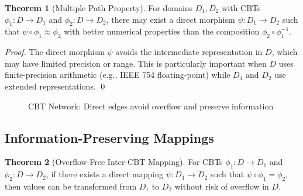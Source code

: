 \documentclass[12pt,a4paper]{article}
\theoremstyle{definition}
\newtheorem{theorem}{Theorem}
\begin{document}
\begin{theorem}[Multiple Path Property]
\label{thm:multiple-paths}
For domains $D_1, D_2$ with CBTs $\phi_1: D \to D_1$ and $\phi_2: D \to D_2$, there may exist a direct morphism $\psi: D_1 \to D_2$ such that $\psi \circ \phi_1 \approx \phi_2$ with better numerical properties than the composition $\phi_2 \circ \phi_1^{-1}$.
\end{theorem}

\begin{proof}
The direct morphism $\psi$ avoids the intermediate representation in $D$, which may have limited precision or range. This is particularly important when $D$ uses finite-precision arithmetic (e.g., IEEE 754 floating-point) while $D_1$ and $D_2$ use extended representations. \qed
\end{proof}

\begin{figure}[h]
\centering
{}
\caption{CBT Network: Direct edges avoid overflow and preserve information}
\end{figure}

\subsection{Information-Preserving Mappings}

\begin{theorem}[Overflow-Free Inter-CBT Mapping]
\label{thm:overflow-free}
For CBTs $\phi_1: D \to D_1$ and $\phi_2: D \to D_2$, if there exists a direct mapping $\psi: D_1 \to D_2$ such that $\psi \circ \phi_1 = \phi_2$, then values can be transformed from $D_1$ to $D_2$ without risk of overflow in $D$.
\end{theorem}
\end{document}
